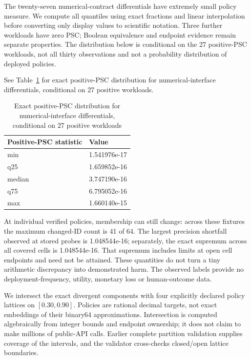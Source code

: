 \documentclass[11pt,a4paper]{article}
\theoremstyle{plain}
\theoremstyle{definition}
\theoremstyle{remark}
\begin{document}
The twenty-seven numerical-contract differentials have extremely small policy measure. We compute all quantiles using exact fractions and linear interpolation before converting only display values to scientific notation. Three further workloads have zero PSC; Boolean equivalence and endpoint evidence remain separate properties. The distribution below is conditional on the 27 positive-PSC workloads, not all thirty observations and not a probability distribution of deployed policies.

See Table~\ref{tab:s5} for exact positive-PSC distribution for numerical-interface differentials, conditional on 27 positive workloads.

\begin{table}[!htbp]
\caption{Exact positive-PSC distribution for numerical-interface differentials, conditional on 27 positive workloads}\label{tab:s5}
\centering
\footnotesize
\setlength{\tabcolsep}{4pt}
\renewcommand{\arraystretch}{1.15}
\begin{tabularx}{\textwidth}{@{} >{\raggedright\arraybackslash}X >{\centering\arraybackslash}p{3.5cm} @{}}
\toprule
\textbf{Positive-PSC statistic} & \textbf{Value} \\
\midrule
min & 1.541976e-17 \\
q25 & 1.659852e-16 \\
median & 3.747190e-16 \\
q75 & 6.795052e-16 \\
max & 1.660140e-15 \\
\bottomrule
\end{tabularx}
\end{table}
\FloatBarrier

At individual verified policies, membership can still change: across these fixtures the maximum changed-ID count is 41 of 64. The largest precision shortfall observed at stored probes is 1.048544e-16; separately, the exact supremum across all covered cells is 1.048544e-16. That supremum includes limits at open cell endpoints and need not be attained. These quantities do not turn a tiny arithmetic discrepancy into demonstrated harm. The observed labels provide no deployment-frequency, utility, monetary loss or human-outcome data.

We intersect the exact divergent components with four explicitly declared policy lattices on $[0.30, 0.90]$. Policies are rational decimal targets, not exact embeddings of their binary64 approximations. Intersection is computed algebraically from integer bounds and endpoint ownership; it does not claim to make millions of public-API calls. Earlier complete partition validation supplies coverage of the intervals, and the validator cross-checks closed/open lattice boundaries.
\end{document}
